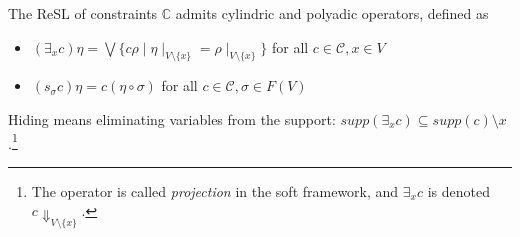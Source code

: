 \documentclass{llncs}
\begin{document}
\begin{lemma}
	The ReSL of constraints $\mathbb{C}$ admits cylindric and polyadic operators, defined as
	\begin{itemize}
		\item  $(\exists_x c) \eta = \bigvee \{c \rho \mid \eta\mid_{V \setminus \{x\}} = 
		\rho\mid_{V \setminus \{x\}}\}$ for all $c \in {\mathcal C}, x \in V$
		\item  $(s_\sigma c) \eta = c (\eta \circ \sigma)$ for all $c \in {\mathcal C}, \sigma \in F(V)$	
	\end{itemize}
\end{lemma}

Hiding means eliminating variables from the support:
$supp(\exists_x c) \subseteq supp({c}) \setminus {x}$.\footnote{The operator
	is called \emph{projection} in the soft framework,
	and $\exists_x c$ is denoted $c\Downarrow_{V\setminus \{x\}}$.}
\end{document}
